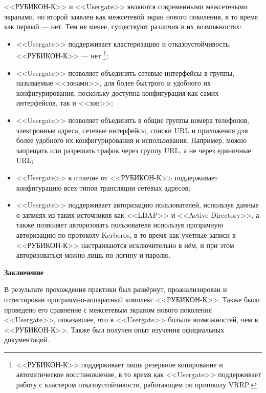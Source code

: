 <<РУБИКОН-К>> и <<Usergate>> являются современными межсетевыми экранами, но второй заявлен как межсетевой экран нового поколения, в то время как первый --- нет. Тем не менее, существуют различия в их возможностях:
\begin{itemize}
	\item <<Usergate>> поддерживает кластеризацию и отказоустойчивость, <<РУБИКОН-К>> --- нет \footnote{<<РУБИКОН-К>> поддерживает лишь резервное копирование и автоматическое восстановление, в то время как <<Usergate>> поддерживает работу с кластером отказоустойчивости, работающем по протоколу VRRP.};
	
	\item <<Usergate>> позволяет объединять сетевые интерфейсы в группы, называемые <<зонами>>, для более быстрого и удобного их конфигурирования, поскольку доступна конфигурация как самих интерфейсов, так и <<зон>>;
	
	\item  <<Usergate>> позволяет объединять в общие группы номера телефонов, электронные адреса, сетевые интерфейсы, списки URL и приложения для более удобного их конфигурирования и использования. Например, можно запрещать или разрешать трафик через группу URL, а не через единичные URL;
	
	\item <<Usergate>> в отличие от <<РУБИКОН-К>> поддерживает конфигурацию всех типов трансляции сетевых адресов;

	\item <<Usergate>> поддерживает авторизацию пользователей, используя данные о записях из таких источников как <<LDAP>> и <<Active Directory>>, а также позволяет авторизовать пользователя используя прозрачную авторизацию по протоколу Kerberos, в то время как учётные записи в <<РУБИКОН-К>> настраиваются исключительно в нём, и при этом авторизоваться можно лишь по логину и паролю.
\end{itemize}

\newpage

\begin{center}
	\textbf{\Large Заключение}
\end{center}

В результате прохождения практики был развёрнут, проанализирован и оттестирован программно-аппаратный комплекс <<РУБИКОН-К>>. Также было проведено его сравнение с межсетевым экраном нового поколения <<Usergate>>, показавшее, что в <<Usergate>> больше возможностей, чем в <<РУБИКОН-К>>. Также был получен опыт изучения официальных документаций.

